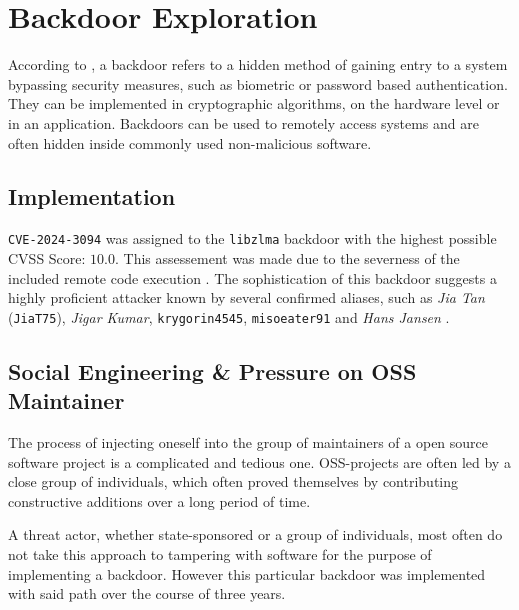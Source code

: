 \section{Backdoor Exploration}

According to \cite{wysopal2007static}, a backdoor refers to a hidden method of
gaining entry to a system bypassing security measures, such as biometric or
password based authentication. They can be implemented in cryptographic
algorithms, on the hardware level or in an application. Backdoors can be used
to remotely access systems and are often hidden inside commonly used
non-malicious software.

\subsection{Implementation}

\texttt{CVE-2024-3094} was assigned to the \texttt{libzlma} backdoor with the
highest possible CVSS Score: $10.0$. This assessement was made due to the
severness of the included remote code execution \cite{redhat2024cve}. The
sophistication of this backdoor suggests a highly proficient attacker known by
several confirmed aliases, such as \textit{Jia Tan} (\texttt{JiaT75}),
\textit{Jigar Kumar}, \texttt{krygorin4545}, \texttt{misoeater91} and
\textit{Hans Jansen} \cite{arstechnica2024xzutils}.

\subsection{Social Engineering \& Pressure on OSS Maintainer}

The process of injecting oneself into the group of maintainers of a open source
software project is a complicated and tedious one. OSS-projects are often led
by a close group of individuals, which often proved themselves by contributing
constructive additions over a long period of time.

A threat actor, whether state-sponsored or a group of individuals, most often
do not take this approach to tampering with software for the purpose of
implementing a backdoor. However this particular backdoor was implemented with
said path over the course of three years.

